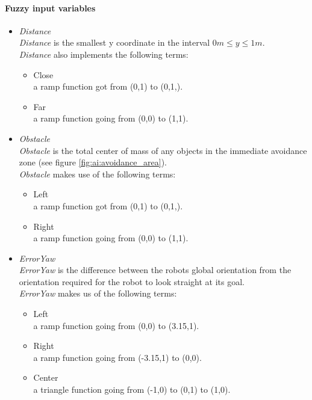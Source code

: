 \documentclass[../../../Main.tex]{subfiles}
\begin{document}
\paragraph{Fuzzy input variables}%
\label{par:fuzzy_input_variables}
\begin{itemize}
	\item \textit{Distance} \\
		\textit{Distance} is the smallest y coordinate in the interval $0\si{m} \leq y \leq 1\si{m}$.\\
		\textit{Distance}  also implements the following terms:
		\begin{itemize}
			\item Close\\
				a ramp function got from (0,1) to (0,1,).
			\item Far\\
				a ramp function going from (0,0) to (1,1).
		\end{itemize}

	\item \textit{Obstacle} \\
		\textit{Obstacle} is the total center of mass of any objects in the
		immediate avoidance zone (see figure \ref{fig:ai:avoidance_area}).\\
		\textit{Obstacle} makes use of the following terms:
		\begin{itemize}
			\item Left\\
				a ramp function got from (0,1) to (0,1,).
			\item Right\\
				a ramp function going from (0,0) to (1,1).
		\end{itemize}
	\item \textit{ErrorYaw} \\
		\textit{ErrorYaw} is the difference between the robots global orientation from the orientation
		required for the robot to look straight at its goal.\\
		\textit{ErrorYaw} makes us of the following terms:
		\begin{itemize}
			\item Left\\
				a ramp function going from (0,0) to (3.15,1).
			\item Right\\
				a ramp function going from (-3.15,1) to (0,0).
			\item Center\\
				a triangle function going from (-1,0) to (0,1) to (1,0).
		\end{itemize}
\end{itemize}
\end{document}
